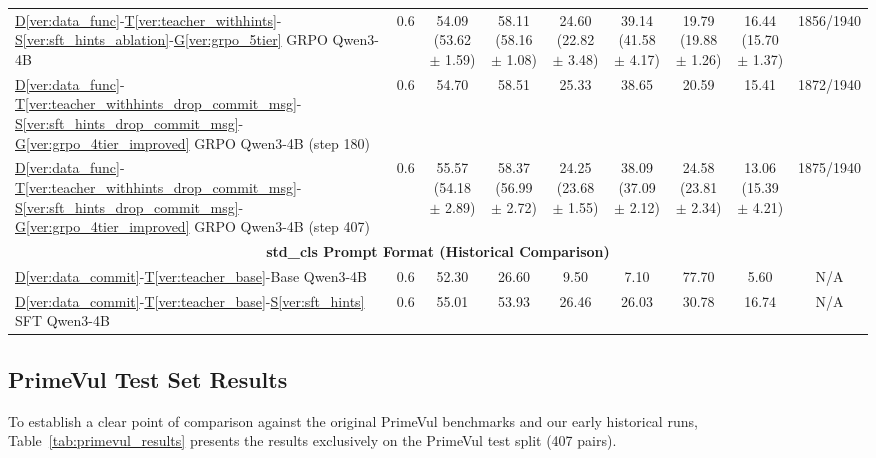 \documentclass[12pt,a4paper]{article}
\newcommand{\vcode}[4]{\hyperref[#1]{D\ref*{#1}}-\hyperref[#2]{T\ref*{#2}}-\hyperref[#3]{S\ref*{#3}}-\hyperref[#4]{G\ref*{#4}}}
\newcommand{\vcodeSFT}[3]{\hyperref[#1]{D\ref*{#1}}-\hyperref[#2]{T\ref*{#2}}-\hyperref[#3]{S\ref*{#3}}}
\newcommand{\vcodeBase}[2]{\hyperref[#1]{D\ref*{#1}}-\hyperref[#2]{T\ref*{#2}}-Base}
\begin{document}
\begin{table}[H]
\begin{minipage}{\paperwidth}
{\begin{tabular}{lcccccccc}
\vcode{ver:data_func}{ver:teacher_withhints}{ver:sft_hints_ablation}{ver:grpo_5tier} GRPO Qwen3-4B & 0.6 & 54.09 (53.62 $\pm$ 1.59) & 58.11 (58.16 $\pm$ 1.08) & 24.60 (22.82 $\pm$ 3.48) & 39.14 (41.58 $\pm$ 4.17) & 19.79 (19.88 $\pm$ 1.26) & 16.44 (15.70 $\pm$ 1.37) & 1856/1940 \\
\vcode{ver:data_func}{ver:teacher_withhints_drop_commit_msg}{ver:sft_hints_drop_commit_msg}{ver:grpo_4tier_improved} GRPO Qwen3-4B (step 180) & 0.6 & 54.70 & 58.51 & 25.33 & 38.65 & 20.59 & 15.41 & 1872/1940 \\
\vcode{ver:data_func}{ver:teacher_withhints_drop_commit_msg}{ver:sft_hints_drop_commit_msg}{ver:grpo_4tier_improved} GRPO Qwen3-4B (step 407) & 0.6 & 55.57 (54.18 $\pm$ 2.89) & 58.37 (56.99 $\pm$ 2.72) & 24.25 (23.68 $\pm$ 1.55) & 38.09 (37.09 $\pm$ 2.12) & 24.58 (23.81 $\pm$ 2.34) & 13.06 (15.39 $\pm$ 4.21) & 1875/1940 \\
\midrule
\multicolumn{9}{c}{\textbf{std\_cls Prompt Format (Historical Comparison)}} \\
\midrule
\vcodeBase{ver:data_commit}{ver:teacher_base} Qwen3-4B & 0.6 & 52.30 & 26.60 & 9.50 & 7.10 & 77.70 & 5.60 & N/A \\
\vcodeSFT{ver:data_commit}{ver:teacher_base}{ver:sft_hints} SFT Qwen3-4B & 0.6 & 55.01 & 53.93 & 26.46 & 26.03 & 30.78 & 16.74 & N/A \\
\bottomrule
\end{tabular}%
}
\end{minipage}
\end{table}

\subsection{PrimeVul Test Set Results}

To establish a clear point of comparison against the original PrimeVul benchmarks and our early historical runs, Table~\ref{tab:primevul_results} presents the results exclusively on the PrimeVul test split (407 pairs).
\end{document}
